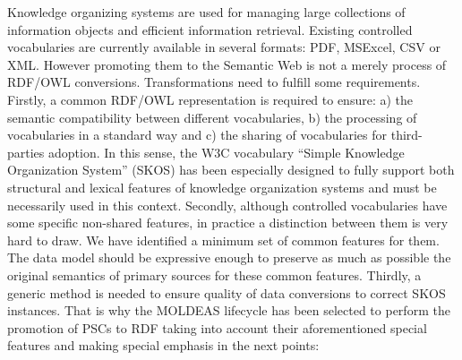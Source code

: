 Knowledge organizing systems are used for managing large collections of information objects and efficient information retrieval. 
Existing controlled vocabularies are currently available in several formats: PDF, MSExcel, CSV or XML. However promoting them 
to the Semantic Web is not a merely process of RDF/OWL conversions. Transformations need to fulfill some requirements. Firstly, 
a common RDF/OWL representation is required to ensure: a) the semantic compatibility between different vocabularies,
b) the processing of vocabularies in a standard way and c) the sharing of vocabularies for third-parties adoption. In this sense, 
the W3C vocabulary ``Simple Knowledge Organization System'' (SKOS) has been especially designed to fully support 
both structural and lexical features of knowledge organization systems and must be necessarily used in this context. 
Secondly, although controlled vocabularies have some specific non-shared features, in practice a distinction between them is very hard to draw. 
We have identified a minimum set of common features for them. The data model should be expressive enough to preserve as much as 
possible the original semantics of primary sources for these common features. Thirdly, a generic method is needed to ensure quality 
of data conversions to correct SKOS instances. That is why the MOLDEAS lifecycle has been selected to perform the promotion 
of PSCs to RDF taking into account their aforementioned special features and making special emphasis in the next points:
